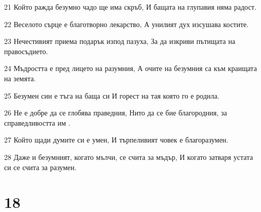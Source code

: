 \par 21 Който ражда безумно чадо ще има скръб, И бащата на глупавия няма радост.
\par 22 Веселото сърце е благотворно лекарство, А унилият дух изсушава костите.
\par 23 Нечестивият приема подарък изпод пазуха, За да изкриви пътищата на правосъдието.
\par 24 Мъдростта е пред лицето на разумния, А очите на безумния са към краищата на земята.
\par 25 Безумен син е тъга на баща си И горест на тая която го е родила.
\par 26 Не е добре да се глобява праведния, Нито да се бие благородния, за справедливостта им .
\par 27 Който щади думите си е умен, И търпеливият човек е благоразумен.
\par 28 Даже и безумният, когато мълчи, се счита за мъдър, И когато затваря устата си се счита за разумен.

\chapter{18}

